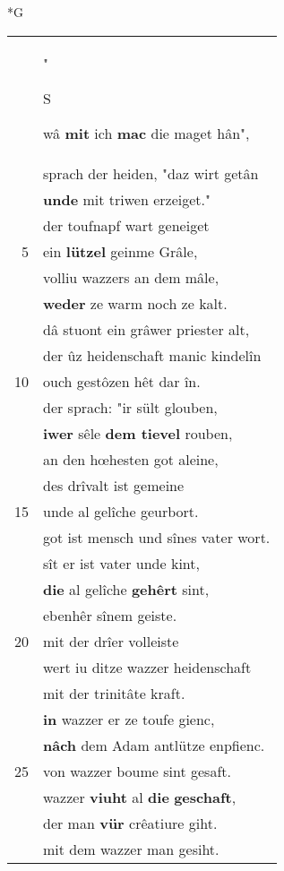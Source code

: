 \documentclass[8pt,a4paper,notitlepage]{article}
\begin{document}
\newpage
\begin{table}[ht]
\begin{minipage}[t]{0.5\linewidth}
\small
\begin{center}*G
\end{center}
\begin{tabular}{rl}
 & "\begin{large}S\end{large}wâ \textbf{mit} ich \textbf{mac} die maget hân",\\ 
 & sprach der heiden, "daz wirt getân\\ 
 & \textbf{unde} mit triwen erzeiget."\\ 
 & der toufnapf wart geneiget\\ 
5 & ein \textbf{lützel} geinme Grâle,\\ 
 & volliu wazzers an dem mâle,\\ 
 & \textbf{weder} ze warm noch ze kalt.\\ 
 & dâ stuont ein grâwer priester alt,\\ 
 & der ûz heidenschaft manic kindelîn\\ 
10 & ouch gestôzen hêt dar în.\\ 
 & der sprach: "ir sült glouben,\\ 
 & \textbf{iwer} sêle \textbf{dem tievel} rouben,\\ 
 & an den hœhesten got aleine,\\ 
 & des drîvalt ist gemeine\\ 
15 & unde al gelîche geurbort.\\ 
 & got ist mensch und sînes vater wort.\\ 
 & sît er ist vater unde kint,\\ 
 & \textbf{die} al gelîche \textbf{gehêrt} sint,\\ 
 & ebenhêr sînem geiste.\\ 
20 & mit der drîer volleiste\\ 
 & wert iu ditze wazzer heidenschaft\\ 
 & mit der trinitâte kraft.\\ 
 & \textbf{in} wazzer er ze toufe gienc,\\ 
 & \textbf{nâch} dem Adam antlütze enpfienc.\\ 
25 & von wazzer boume sint gesaft.\\ 
 & wazzer \textbf{viuht} al \textbf{die} \textbf{geschaft},\\ 
 & der man \textbf{vür} crêatiure giht.\\ 
 & mit dem wazzer man gesiht.\\ 

\end{tabular}
\end{minipage}
\end{table}
\end{document}
